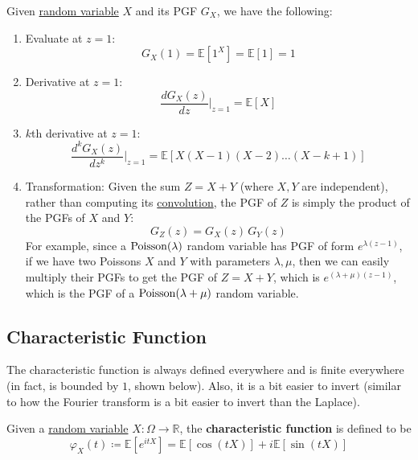 	\begin{lemma}
	  \label{thm:properties-of-pgf}
		Given \hyperref[def:random-variable]{random variable} $X$ and its PGF $G_X$, we have the following: 
		\begin{enumerate}
			\item Evaluate at $z = 1$: 
			\begin{equation}
				G_X (1) = \mathbb{E}[1^X] = \mathbb{E}[1] = 1
			\end{equation}
			\item Derivative at $z = 1$: 
			\begin{equation}
				\frac{d G_X (z)}{d z} \bigg|_{z = 1} = \mathbb{E}[X]
			\end{equation}
			\item $k$th derivative at $z = 1$: 
			\begin{equation}
				\frac{d^k G_X (z)}{d z^k} \bigg|_{z = 1} = \mathbb{E}[X (X-1) (X-2) \ldots (X-k +1)]
			\end{equation}
			\item Transformation: Given the sum $Z = X + Y$ (where $X, Y$ are independent), rather than computing its \hyperref[def:convolution]{convolution}, the PGF of $Z$ is simply the product of the PGFs of $X$ and $Y$: 
			\begin{equation}
				G_Z (z) = G_X (z) \, G_Y (z)
			\end{equation}
			For example, since a $\operatorname{Poisson}(\lambda)$ random variable has PGF of form $e^{\lambda (z - 1)}$, if we have two Poissons $X$ and $Y$ with parameters $\lambda, \mu$, then we can easily multiply their PGFs to get the PGF of $Z = X + Y$, which is $e^{(\lambda + \mu)(z - 1)}$, which is the PGF of a $\operatorname{Poisson}(\lambda + \mu)$ random variable. 
		\end{enumerate}
	\end{lemma}

\subsection{Characteristic Function}

	The characteristic function is always defined everywhere and is finite everywhere (in fact, is bounded by $1$, shown below). Also, it is a bit easier to invert (similar to how the Fourier transform is a bit easier to invert than the Laplace). 

	\begin{definition}
	  \label{def:characteristic-function}
		Given a \hyperref[def:random-variable]{random variable} $X: \Omega \to \mathbb{R}$, the \textbf{characteristic function} is defined to be 
		\begin{equation}
			\varphi_X (t) \coloneqq \mathbb{E}[ e^{i t X} ] = \mathbb{E}[\cos{(t X)}] + i \mathbb{E}[ \sin{(t X)}]
		\end{equation}
	\end{definition}

